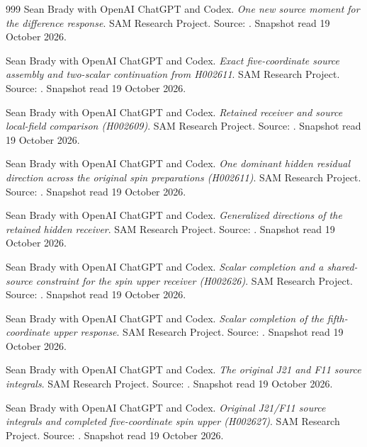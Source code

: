 \begin{thebibliography}{999}
 Sean Brady with OpenAI ChatGPT and Codex. \emph{One new source moment for the difference response}. SAM Research Project. Source: . Snapshot read 19 October 2026.

 Sean Brady with OpenAI ChatGPT and Codex. \emph{Exact five-coordinate source assembly and two-scalar continuation from H002611}. SAM Research Project. Source: . Snapshot read 19 October 2026.

 Sean Brady with OpenAI ChatGPT and Codex. \emph{Retained receiver and source local-field comparison (H002609)}. SAM Research Project. Source: . Snapshot read 19 October 2026.

 Sean Brady with OpenAI ChatGPT and Codex. \emph{One dominant hidden residual direction across the original spin preparations (H002611)}. SAM Research Project. Source: . Snapshot read 19 October 2026.

 Sean Brady with OpenAI ChatGPT and Codex. \emph{Generalized directions of the retained hidden receiver}. SAM Research Project. Source: . Snapshot read 19 October 2026.

 Sean Brady with OpenAI ChatGPT and Codex. \emph{Scalar completion and a shared-source constraint for the spin upper receiver (H002626)}. SAM Research Project. Source: . Snapshot read 19 October 2026.

 Sean Brady with OpenAI ChatGPT and Codex. \emph{Scalar completion of the fifth-coordinate upper response}. SAM Research Project. Source: . Snapshot read 19 October 2026.

 Sean Brady with OpenAI ChatGPT and Codex. \emph{The original J21 and F11 source integrals}. SAM Research Project. Source: . Snapshot read 19 October 2026.

 Sean Brady with OpenAI ChatGPT and Codex. \emph{Original J21/F11 source integrals and completed five-coordinate spin upper (H002627)}. SAM Research Project. Source: . Snapshot read 19 October 2026.


\end{thebibliography}
